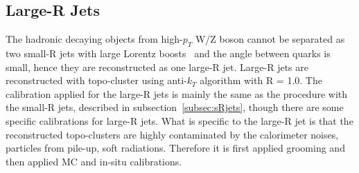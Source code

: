 \subsection{Large-R Jets}
The hadronic decaying objects from high-$p_T$ W/Z boson cannot be separated as two small-R jets with large Lorentz boosts~\cite{JETM-2018-06} and the angle between quarks is small, hence they are reconstructed as one large-R jet.
Large-R jets are reconstructed with topo-cluster using anti-$k_T$ algorithm with R = 1.0. 
The calibration applied for the large-R jets is mainly the same as the procedure with the small-R jets, described in subsection~\ref{subsec:sRjets}, though there are some specific calibrations for large-R jets.
What is specific to the large-R jet is that the reconstructed topo-clusters are highly contaminated by the calorimeter noises, particles from pile-up, soft radiations. Therefore it is first applied grooming and then applied MC and in-situ calibrations. 
